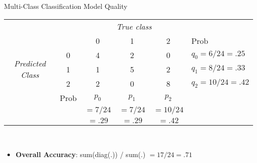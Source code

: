 \documentclass[ignorenonframetext,xcolor=x11names]{beamer}
\begin{document}
 
\begin{frame}{Multi-Class Classification Model Quality}
\begin{block}{}
\small
\begin{center}
\renewcommand{\arraystretch}{1.25}

\begin{tabular}{cc|ccc|l} \hline
     & & \multicolumn{3}{c|}{\emph{True class}} \\
                 &   & 0 & 1 & 2 & Prob \\ \hline
\multirow{3}{1.1cm}{\emph{Predicted Class}} & 0 & 4 & 2 & 0 & $q_0 = 6/24  = .25$ \\ 
                 & 1 & 1 & 5 & 2 & $q_1 = 8/24  = .33$ \\
                 & 2 & 2 & 0 & 8 & $q_2 = 10/24 = .42$ \\ \hline
     & Prob & $p_0$ & $p_1$ & $p_2$ &  \\
     &      & $=7/24$ & $=7/24$ & $=10/24$ &  \\ 
     &      & $=.29$ & $=.29$ & $=.42$ &  \\ \hline
\end{tabular} \\
\end{center}
\end{block}
\begin{itemize}
   \item \textbf{Overall Accuracy}: sum(diag(.)) / sum(.) $=17/24=.71$
\end{itemize}
\end{frame}
\end{document}
